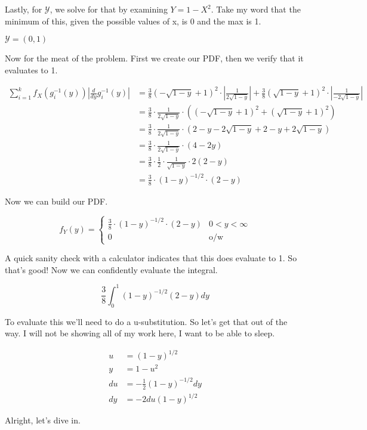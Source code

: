 Lastly, for $\mathcal{Y}$, we solve for that by examining $Y = 1 - X^{2}$. Take my word that the minimum of this, given the possible values of x, is 0 and the max is 1.

$\mathcal{Y} = (0,1)$

Now for the meat of the problem. First we create our PDF, then we verify that it evaluates to 1.

\begin{align*}
	\sum_{i=1}^k f_X(g_i^{-1}(y)) \left| \frac{d}{dy}g_i^{-1}(y) \right| 
	&= \frac{3}{8} (-\sqrt{1-y} + 1)^2 \cdot \left| \frac{1}{2\sqrt{1-y}} \right| + \frac{3}{8} (\sqrt{1-y} + 1)^2 \cdot \left| \frac{1}{-2\sqrt{1-y}} \right| \\
	&= \frac{3}{8} \cdot \frac{1}{2\sqrt{1-y}} \cdot ( (-\sqrt{1-y} + 1)^2 + (\sqrt{1-y} + 1)^2 ) \\
	&= \frac{3}{8} \cdot \frac{1}{2\sqrt{1-y}} \cdot (2 - y - 2\sqrt{1-y} + 2 - y + 2\sqrt{1-y}) \\
	&= \frac{3}{8} \cdot \frac{1}{2\sqrt{1-y}} \cdot (4 - 2y) \\
	&= \frac{3}{8} \cdot \frac{1}{2} \cdot \frac{1}{\sqrt{1-y}} \cdot 2(2 - y) \\
	&= \frac{3}{8} \cdot (1-y)^{-1/2} \cdot (2-y) 
\end{align*}

Now we can build our PDF.

\[
	f_Y(y) = \begin{cases}
		 \frac{3}{8} \cdot (1-y)^{-1/2} \cdot (2-y) & 0 < y < \infty \\
		 0 & \text{o/w}
	\end{cases}
\]

A quick sanity check with a calculator indicates that this does evaluate to 1. So that's good! Now we can confidently evaluate the integral.

\[
	\frac{3}{8} \int_0^1 (1-y)^{-1/2} (2-y) dy
\]

To evaluate this we'll need to do a u-substitution. So let's get that out of the way. I will not be showing all of my work here, I want to be able to sleep. 

\begin{align*}
	u &= (1-y)^{1/2} \\
	y &= 1 - u^2 \\
	du &= -\frac{1}{2} (1-y)^{-1/2} dy \\
	dy &= -2du(1-y)^{1/2}
\end{align*}

Alright, let's dive in.

